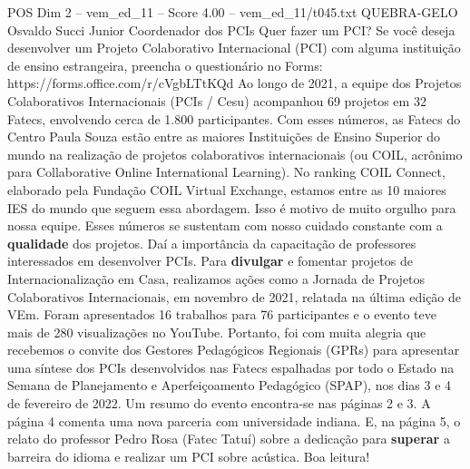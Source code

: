 \begin{textsample}{POS Dim 2 – vem\_ed\_11 – Score 4.00 – vem\_ed\_11/t045.txt}  \label{ex:f2_pos_154}
QUEBRA-GELO Osvaldo Succi Junior Coordenador dos PCIs Quer fazer um PCI?
Se você deseja desenvolver um Projeto Colaborativo Internacional (PCI) com alguma instituição de ensino estrangeira, preencha o questionário no Forms: https://forms.office.com/r/cVgbLTtKQd Ao longo de 2021, a equipe dos Projetos Colaborativos Internacionais (PCIs / Cesu) acompanhou 69 projetos em 32 Fatecs, envolvendo cerca de 1.800 participantes.
Com esses números, as Fatecs do Centro Paula Souza estão entre as maiores Instituições de Ensino Superior do mundo na realização de projetos colaborativos internacionais (ou COIL, acrônimo para Collaborative Online International Learning).
No ranking COIL Connect, elaborado pela Fundação COIL Virtual Exchange, estamos entre as 10 maiores IES do mundo que seguem essa abordagem.
Isso é motivo de muito orgulho para nossa equipe.
Esses números se sustentam com nosso cuidado constante com a \textbf{qualidade} dos projetos.
Daí a importância da capacitação de professores interessados em desenvolver PCIs.
Para \textbf{divulgar} e fomentar projetos de Internacionalização em Casa, realizamos ações como a Jornada de Projetos Colaborativos Internacionais, em novembro de 2021, relatada na última edição de VEm.
Foram apresentados 16 trabalhos para 76 participantes e o evento teve mais de 280 visualizações no YouTube.
Portanto, foi com muita alegria que recebemos o convite dos Gestores Pedagógicos Regionais (GPRs) para apresentar uma síntese dos PCIs desenvolvidos nas Fatecs espalhadas por todo o Estado na Semana de Planejamento e Aperfeiçoamento Pedagógico (SPAP), nos dias 3 e 4 de fevereiro de 2022.
Um resumo do evento encontra-se nas páginas 2 e 3.
A página 4 comenta uma nova parceria com universidade indiana.
E, na página 5, o relato do professor Pedro Rosa (Fatec Tatuí) sobre a dedicação para \textbf{superar} a barreira do idioma e realizar um PCI sobre acústica.
Boa leitura!

\end{textsample}
